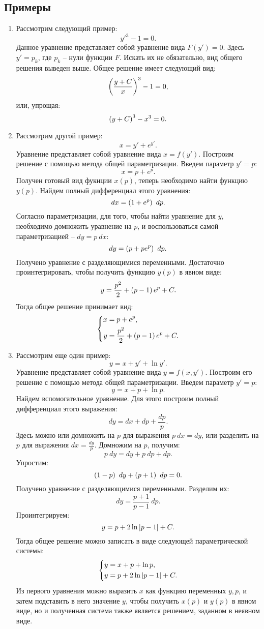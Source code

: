	\subsection{Примеры}

		\begin{enumerate}

			\item Рассмотрим следующий пример:
				\[ y'^3 - 1 = 0. \]
				Данное уравнение представляет собой уравнение вида $F(y') = 0$. Здесь $y' = p_k$, где $p_k$ -- нули функции $F$. Искать их не обязательно, вид общего решения выведен выше. Общее решение имеет следующий вид:
				\[ \left( \frac{y + C}{x} \right)^3 - 1 = 0, \]
				или, упрощая:
				\[ \left( y + C \right)^3 - x^3 = 0. \]
				
			\item Рассмотрим другой пример:
				\[ x = y' + e^{y'}. \]
				Уравнение представляет собой уравнение вида $x = f(y')$. Построим решение с помощью метода общей параметризации. Введем параметр $y' = p$:
				\[ x = p + e^p. \]
				Получен готовый вид фукнции $x(p)$, теперь необходимо найти функцию $y(p)$. Найдем полный дифференциал этого уравнения:
				\[ dx = \left( 1 + e^{p} \right) ~ dp. \]
				Согласно параметризации, для того, чтобы найти уравнение для $y$, необходимо домножить уравнение на $p$, и воспользоваться самой параметризацией -- $dy = p ~ dx$:
				\[ dy = \left( p + pe^{p} \right) ~ dp. \]
				Получено уравнение с разделяющимися переменными. Достаточно проинтегрировать, чтобы получить функцию $y(p)$ в явном виде:
				\[ y = \frac{p^2}{2} + \left( p - 1 \right) e^{p} + C. \]
				Тогда общее решение принимает вид:
				\[ \left\lbrace \begin{split} x &= p + e^{p}, \\ y &= \frac{p^2}{2} + \left( p-1 \right) e^{p} + C. \end{split} \right. \]

			\item Рассмотрим еще один пример:
				\[ y = x + y' + \ln{y'}. \]
				Уравнение представляет собой уравнение вида $y = f(x, y')$. Построим его решение с помощью метода общей параметризации. Введем параметр $y' = p$:
				\[ y = x + p + \ln{p}. \]
				Найдем вспомогательное уравнение. Для этого построим полный дифференциал этого выражения:
				\[ dy = dx + dp + \frac{dp}{p}. \]
				Здесь можно или домножить на $p$ для выражения $p ~ dx = dy$, или разделить на $p$ для выражения $dx = \frac{dy}{p}$. Домножим на $p$, получим:
				\[ p ~ dy = dy + p ~ dp + dp. \]
				Упростим:
				\[ \left( 1 - p \right) ~ dy + \left( p + 1 \right) ~ dp = 0. \]
				Получено уравнение с разделяющимися переменными. Разделим их:
				\[ dy = \frac{p + 1}{p - 1} ~ dp. \]
				Проинтегрируем:
				\[ y = p + 2\ln\left\vert p - 1 \right\vert + C. \]
				Тогда общее решение можно записать в виде следующей параметрической системы:
				\[ \left\lbrace \begin{split} y &= x + p + \ln{p}, \\ y &= p + 2 \ln\left\vert p-1 \right\vert + C. \end{split} \right. \]
				Из первого уравнения можно выразить $x$ как функцию переменных $y, p$, и затем подставить в него значение $y$, чтобы получить $x(p)$ и $y(p)$ в явном виде, но и полученная система также является решением, заданном в неявном виде.

		\end{enumerate}

	\pagebreak
